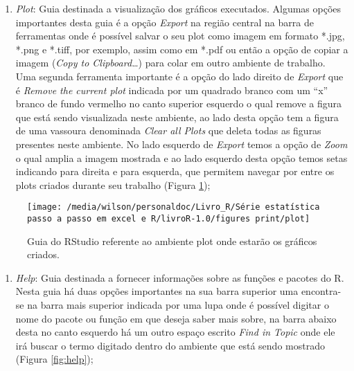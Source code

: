 \documentclass[14pt,titlepage, oneside, openany, a4paper]{book}
\providecommand{\tightlist}{%
  \setlength{\itemsep}{0pt}\setlength{\parskip}{0pt}}
\begin{document}
\begin{enumerate}
\def\labelenumi{\arabic{enumi}.}
\setcounter{enumi}{6}
\tightlist
\item
  \emph{Plot}: Guia destinada a visualização dos gráficos executados. Algumas opções importantes desta guia é a opção \emph{Export} na região central na barra de ferramentas onde é possível salvar o seu plot como imagem em formato *.jpg, *.png e *.tiff, por exemplo, assim como em *.pdf ou então a opção de copiar a imagem (\emph{Copy to Clipboard\ldots{}}) para colar em outro ambiente de trabalho. Uma segunda ferramenta importante é a opção do lado direito de \emph{Export} que é \emph{Remove the current plot} indicada por um quadrado branco com um ``x'' branco de fundo vermelho no canto superior esquerdo o qual remove a figura que está sendo visualizada neste ambiente, ao lado desta opção tem a figura de uma vassoura denominada \emph{Clear all Plots} que deleta todas as figuras presentes neste ambiente. No lado esquerdo de \emph{Export} temos a opção de \emph{Zoom} o qual amplia a imagem mostrada e ao lado esquerdo desta opção temos setas indicando para direita e para esquerda, que permitem navegar por entre os plots criados durante seu trabalho (Figura \ref{fig:plot});
\end{enumerate}

\begin{figure}[H]

{\centering \texttt{[image: /media/wilson/personaldoc/Livro\_R/Série estatística passo a passo em excel e R/livroR-1.0/figures print/plot]} 

}

\caption{Guia do RStudio referente ao ambiente plot onde estarão os gráficos criados.}\label{fig:plot}
\end{figure}

\begin{enumerate}
\def\labelenumi{\arabic{enumi}.}
\setcounter{enumi}{7}
\tightlist
\item
  \emph{Help}: Guia destinada a fornecer informações sobre as funções e pacotes do R. Nesta guia há duas opções importantes na sua barra superior uma encontra-se na barra mais superior indicada por uma lupa onde é possível digitar o nome do pacote ou função em que deseja saber mais sobre, na barra abaixo desta no canto esquerdo há um outro espaço escrito \emph{Find in Topic} onde ele irá buscar o termo digitado dentro do ambiente que está sendo mostrado (Figura \ref{fig:help});
\end{enumerate}
\end{document}
